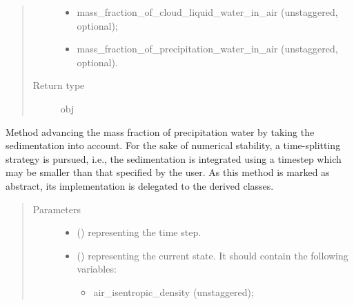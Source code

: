 \documentclass[letterpaper,10pt,english]{sphinxmanual}
\begin{document}
\begin{fulllineitems}
\begin{fulllineitems}
\begin{quote}
\begin{description}
\begin{itemize}
\item {} 
mass\_fraction\_of\_cloud\_liquid\_water\_in\_air (unstaggered, optional);

\item {} 
mass\_fraction\_of\_precipitation\_water\_in\_air (unstaggered, optional).

\end{itemize}


\item[{Return type}] \leavevmode
obj

\end{description}\end{quote}

\end{fulllineitems}


\begin{fulllineitems}
\label{\detokenize{api:dycore.prognostic_isentropic_nonconservative.PrognosticIsentropicNonconservative.step_integrating_sedimentation_flux}}
Method advancing the mass fraction of precipitation water by taking the sedimentation into account.
For the sake of numerical stability, a time-splitting strategy is pursued, i.e., the sedimentation is
integrated using a timestep which may be smaller than that specified by the user.
As this method is marked as abstract, its implementation is delegated to the derived classes.
\begin{quote}\begin{description}
\item[{Parameters}] \leavevmode\begin{itemize}
\item {} 
 () \textendash{}  representing the time step.

\item {} 
 () \textendash{} 
 representing the current state.
It should contain the following variables:
\begin{itemize}
\item {} 
air\_isentropic\_density (unstaggered);


\end{itemize}
\end{itemize}
\end{description}
\end{quote}
\end{fulllineitems}
\end{fulllineitems}
\end{document}
